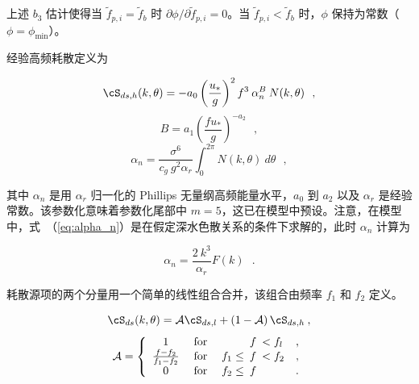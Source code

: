 \noindent
上述 $b_3$ 估计使得当 $\tilde{f}_{p,i} = \tilde{f}_b$ 时 $\partial \phi / \partial \tilde{f}_{p,i} = 0$。当 $\tilde{f}_{p,i} < \tilde{f}_b$ 时，$\phi$ 保持为常数（$\phi = \phi_{\min}$）。


经验高频耗散定义为


\begin{equation}
\cS_{ds,h}(k,\theta) = - a_0 \left ( \frac{u_\ast}{g} \right ) ^2  f^3 \:
\alpha_n^B \: N(k,\theta) \:\:\: , \label{eq:TCdh}
\end{equation} \begin{displaymath}
B = a_1 \left( \frac{ f u_\ast}{g} \right ) ^{-a_2}
\:\:\: , \end{displaymath} \begin{equation}
\alpha_n = \frac{\sigma^6}{c_g \: g^2 \alpha_r} \int_0^{2\pi} N(k,\theta) \: d\theta
\:\:\: , \label{eq:alpha_n} \end{equation}

\noindent
其中 $\alpha_n$ 是用 $\alpha_r$ 归一化的 Phillips 无量纲高频能量水平，$a_0$ 到 $a_2$ 以及 $\alpha_r$ 是经验常数。该参数化意味着参数化尾部中 $m = 5$，这已在模型中预设。注意，在模型中，式~（\ref{eq:alpha_n}）是在假定深水色散关系的条件下求解的，此时 $\alpha_n$ 计算为

\begin{equation}
\alpha_n = \frac{2 \: k^3}{\alpha_r}  F(k)
\:\:\: . \label{eq:alpha_n_mod} \end{equation}

\noindent
耗散源项的两个分量用一个简单的线性组合合并，该组合由频率 $f_1$ 和 $f_2$ 定义。


\begin{equation}
\cS_{ds}(k,\theta) = {\cal{A}} \cS_{ds,l} +
\left ( 1 - {\cal{A}} \right ) \cS_{ds,h}
\: , \label{eq:TCdtot} \end{equation} \begin{equation}
{\cal A} = \left \{ \begin{array}{ccrclc}
  1  & \;{\rm for}\; &          &\!\!\!f& \!\!\! < f_l & ,\\
\frac{ f-f_2}{f_1-f_2}
     & \;{\rm for}\; & f_1 \leq &\!\!\!f& \!\!\! < f_2 & ,\\
  0  & \;{\rm for}\; & f_2 \leq &\!\!\!f&              & .
\end{array} \right . \label{eq:filt_A} \end{equation}

